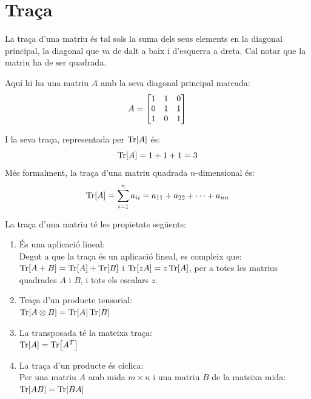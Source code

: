 

\section{Traça}
La traça d'una matriu és tal sols la suma dels seus elements en la diagonal principal, la diagonal que va de dalt a baix i d'esquerra a dreta. Cal notar que la matriu ha de ser quadrada. 

Aquí hi ha una matriu $A$ amb la seva diagonal principal marcada:
$$A = 
	\begin{bmatrix}
		\tikzmarktrace{top}{1} & \tikzmarktrace{top2}{1} & 0 \\
		0 & 1 & \tikzmarktrace{bottom2}{1} \\
		\tikzmarktrace{end}{1} & 0 & \tikzmarktrace{bottom}{1}\\
	\end{bmatrix}
$$

I la seva traça, representada per $\Tr[A]$ és:
$$
\Tr[A] = 1 + 1 + 1 = 3
$$
Més formalment, la traça d'una matriu quadrada $n$-dimensional és:
$$
\Tr[A] = \sum_{i=1}^{n} a_{ii} = a_{11} + a_{22} + \cdots + a_{nn}
$$

La traça d'una matriu té les propietats següents:
\begin{enumerate}
	\item És una aplicació lineal: \\
	Degut a que la traça és un aplicació lineal, es compleix que:\\
	$\Tr[A+B] = \Tr[A] + \Tr[B]$ i $\Tr[zA] = z \Tr[A]$, per a totes les matrius quadrades $A$ i $B$, i tots els escalars $z$.
	\item Traça d'un producte tensorial: \\
	$\Tr[A \otimes B] = \Tr[A]\Tr[B]$
	\item La transposada té la mateixa traça: \\
	$\Tr[A]=\Tr[A^T]$
	\item La traça d'un producte és cíclica: \\
	Per una matriu $A$ amb mida $m \times n$ i una matriu $B$ de la mateixa mida:\\
	$\Tr[AB]=\Tr[BA]$
\end{enumerate}

